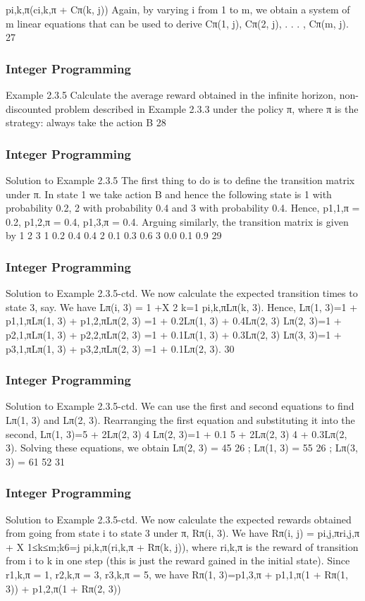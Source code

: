 \begin{frame}
pi,k,π(ci,k,π + Cπ(k, j))
Again, by varying i from 1 to m, we obtain a system of m linear
equations that can be used to derive
Cπ(1, j), Cπ(2, j), . . . , Cπ(m, j).
27 \end{frame}  \begin{frame} \frametitle{Integer Programming}     
Example 2.3.5
Calculate the average reward obtained in the infinite horizon,
non-discounted problem described in Example 2.3.3 under the
policy π, where π is the strategy: always take the action B
28 \end{frame}  \begin{frame} \frametitle{Integer Programming}     
Solution to Example 2.3.5
The first thing to do is to define the transition matrix under π.
In state 1 we take action B and hence the following state is 1 with
probability 0.2, 2 with probability 0.4 and 3 with probability 0.4.
Hence, p1,1,π = 0.2, p1,2,π = 0.4, p1,3,π = 0.4. Arguing similarly,
the transition matrix is given by
1 2 3
1 0.2 0.4 0.4
2 0.1 0.3 0.6
3 0.0 0.1 0.9
29 \end{frame}  \begin{frame} \frametitle{Integer Programming}     
Solution to Example 2.3.5-ctd.
We now calculate the expected transition times to state 3, say. We
have
Lπ(i, 3) = 1 +X
2
k=1
pi,k,πLπ(k, 3).
Hence,
Lπ(1, 3)=1 + p1,1,πLπ(1, 3) + p1,2,πLπ(2, 3)
=1 + 0.2Lπ(1, 3) + 0.4Lπ(2, 3)
Lπ(2, 3)=1 + p2,1,πLπ(1, 3) + p2,2,πLπ(2, 3)
=1 + 0.1Lπ(1, 3) + 0.3Lπ(2, 3)
Lπ(3, 3)=1 + p3,1,πLπ(1, 3) + p3,2,πLπ(2, 3)
=1 + 0.1Lπ(2, 3).
30 \end{frame}  \begin{frame} \frametitle{Integer Programming}     
Solution to Example 2.3.5-ctd.
We can use the first and second equations to find Lπ(1, 3) and
Lπ(2, 3). Rearranging the first equation and substituting it into the
second,
Lπ(1, 3)=5 + 2Lπ(2, 3)
4
Lπ(2, 3)=1 + 0.1
5 + 2Lπ(2, 3)
4
+ 0.3Lπ(2, 3).
Solving these equations, we obtain
Lπ(2, 3) = 45
26
; Lπ(1, 3) = 55
26
; Lπ(3, 3) = 61
52
31 \end{frame}  \begin{frame} \frametitle{Integer Programming}     
Solution to Example 2.3.5-ctd.
We now calculate the expected rewards obtained from going from
state i to state 3 under π, Rπ(i, 3). We have
Rπ(i, j) = pi,j,πri,j,π +
X
1≤k≤m;k6=j
pi,k,π(ri,k,π + Rπ(k, j)),
where ri,k,π is the reward of transition from i to k in one step (this
is just the reward gained in the initial state). Since r1,k,π = 1,
r2,k,π = 3, r3,k,π = 5, we have
Rπ(1, 3)=p1,3,π + p1,1,π(1 + Rπ(1, 3)) + p1,2,π(1 + Rπ(2, 3))

\end{frame}
